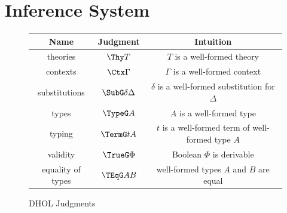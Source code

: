 %


\section{Inference System}\label{sec:rul}
\begin{figure}[hbtp]
\begin{center}
	\begin{tabular}{|c|c|c|}
		\hline 
		Name & Judgment & Intuition \\ 
		\hline
		theories & $\Thy T$ & $T$ is a well-formed theory\\
		contexts & $\Ctx \Gamma$ & $\Gamma$ is a well-formed context\\
		substitutions & $\SubG \delta \Delta$ & $\delta$ is a well-formed substitution for $\Delta$\\
		types & $\TypeG A$ & $A$ is a well-formed type \\ 
		typing & $\TermG tA$ & $t$ is a well-formed term of well-formed type $A$ \\
		validity & $\TrueG \Phi$ & Boolean $\Phi$ is derivable \\ 
		equality of types & $\TEqG AB$ & well-formed types $A$ and $B$ are equal \\ 
		\hline 
	\end{tabular}
\caption{DHOL Judgments}\label{fig:judge}
\end{center}
\end{figure}

